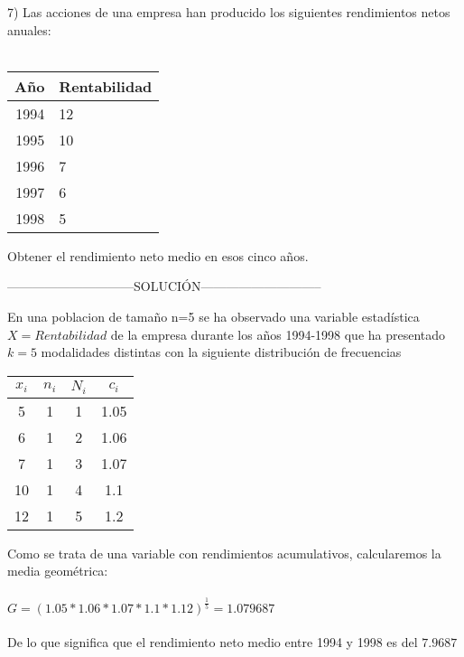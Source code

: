 \documentclass{article}
\begin{document}
7) Las acciones de una empresa han producido los siguientes rendimientos netos anuales:\\\\
\begin{center}
	\begin{tabular}{r l}
	Año & Rentabilidad \\ \hline
	1994 & 12 \\
	1995 &10 \\
	1996 & 7 \\
	1997 & 6 \\
	1998 & 5 \\
\end{tabular}
\end{center}
Obtener el rendimiento neto medio en esos cinco años.

\begin{center}
	------------------------------SOLUCIÓN-----------------------------
\end{center}

En una poblacion de tamaño n=5 se ha observado una variable estadística $ X = Rentabilidad $  de la empresa durante los años 1994-1998 que ha presentado $k = 5$ modalidades distintas con la siguiente distribución de frecuencias
\\

	\begin{center}
		\begin{tabular}{| c | c | c | c | }
			\hline
			
			$x_{i}$ & $n_{i}$ & $N_{i}$ & $c_{i}$ \\ \hline
			5 & 1  & 1 & 1.05 \\
			6 & 1 & 2 & 1.06 \\
			7 & 1 & 3 & 1.07 \\
			10 & 1 & 4 & 1.1 \\
			12 & 1 & 5 & 1.2 \\ \hline
		\end{tabular}
		
	\end{center}
Como se trata de una variable con rendimientos acumulativos, calcularemos la media geométrica:
\\
\\
$ G = (1.05 * 1.06 * 1.07 * 1.1 * 1.12)^{\frac{1}{5}} = 1.079687$
\\
\\
De lo que significa que el rendimiento neto medio entre 1994 y 1998 es del $7.9687$\textperthousand
\end{document}
